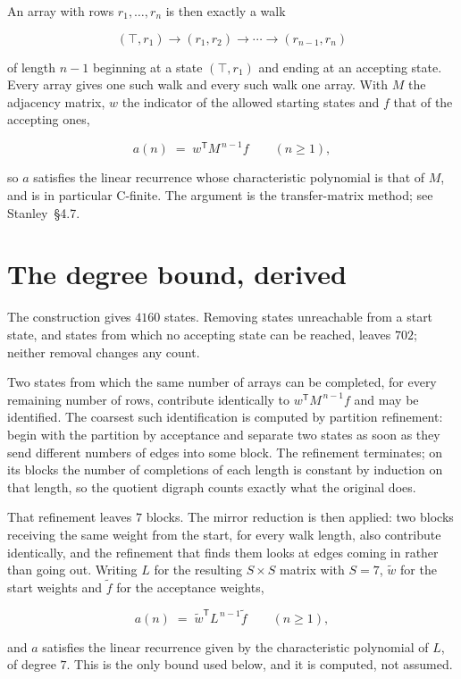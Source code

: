 \documentclass[11pt]{article}
\theoremstyle{definition}
\begin{document}
An array with rows $r_1,\dots,r_n$ is then exactly a walk

\[(\top,r_1) \to (r_1,r_2) \to \cdots \to (r_{n-1},r_n)\]

of length $n-1$ beginning at a state $(\top,r_1)$ and ending at an accepting state. Every array gives one such walk and every such walk one array. With $M$ the adjacency matrix, $w$ the indicator of the allowed starting states and $f$ that of the accepting ones,

\[a(n) \;=\; w^{\mathsf T} M^{\,n-1} f \qquad (n \ge 1),\]

so $a$ satisfies the linear recurrence whose characteristic polynomial is that of $M$, and is in particular C-finite. The argument is the transfer-matrix method; see Stanley~\S4.7.

\section{The degree bound, derived}

The construction gives $4160$ states. Removing states unreachable from a start state, and states from which no accepting state can be reached, leaves $702$; neither removal changes any count.

Two states from which the same number of arrays can be completed, for every remaining number of rows, contribute identically to $w^{\mathsf T}M^{\,n-1}f$ and may be identified. The coarsest such identification is computed by partition refinement: begin with the partition by acceptance and separate two states as soon as they send different numbers of edges into some block. The refinement terminates; on its blocks the number of completions of each length is constant by induction on that length, so the quotient digraph counts exactly what the original does.

That refinement leaves $7$ blocks. The mirror reduction is then applied: two blocks receiving the same weight from the start, for every walk length, also contribute identically, and the refinement that finds them looks at edges coming in rather than going out. Writing $L$ for the resulting $S \times S$ matrix with $S = 7$, $\tilde w$ for the start weights and $\tilde f$ for the acceptance weights,

\[a(n) \;=\; \tilde w^{\mathsf T} L^{\,n-1} \tilde f \qquad (n \ge 1),\]

and $a$ satisfies the linear recurrence given by the characteristic polynomial of $L$, of degree $7$. This is the only bound used below, and it is computed, not assumed.
\end{document}

